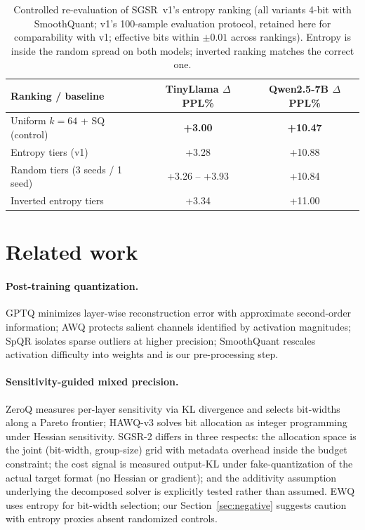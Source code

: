\documentclass{article}
\begin{document}
\begin{table}[t]
\centering
\caption{Controlled re-evaluation of SGSR~v1's entropy ranking (all
variants 4-bit with SmoothQuant; v1's 100-sample evaluation protocol,
retained here for comparability with v1; effective bits within
$\pm 0.01$ across rankings). Entropy is inside the random spread on both
models; inverted ranking matches the correct one.}
\label{tab:negative}
\begin{tabular}{lcc}
\toprule
\textbf{Ranking / baseline} & \textbf{TinyLlama} $\Delta$PPL\% & \textbf{Qwen2.5-7B} $\Delta$PPL\% \\
\midrule
Uniform $k{=}64$ + SQ (control) & \textbf{+3.00} & \textbf{+10.47} \\
Entropy tiers (v1)              & +3.28 & +10.88 \\
Random tiers (3 seeds / 1 seed) & +3.26 -- +3.93 & +10.84 \\
Inverted entropy tiers          & +3.34 & +11.00 \\
\bottomrule
\end{tabular}
\end{table}

\section{Related work}

\paragraph{Post-training quantization.}
GPTQ \citep{gptq} minimizes layer-wise reconstruction error with
approximate second-order information; AWQ \citep{awq} protects salient
channels identified by activation magnitudes; SpQR \citep{spqr} isolates
sparse outliers at higher precision; SmoothQuant \citep{smoothquant}
rescales activation difficulty into weights and is our pre-processing step.

\paragraph{Sensitivity-guided mixed precision.}
ZeroQ \citep{zeroq} measures per-layer sensitivity via KL divergence and
selects bit-widths along a Pareto frontier; HAWQ-v3 \citep{hawqv3} solves
bit allocation as integer programming under Hessian sensitivity. SGSR-2
differs in three respects: the allocation space is the joint
(bit-width, group-size) grid with metadata overhead inside the budget
constraint; the cost signal is measured output-KL under fake-quantization
of the actual target format (no Hessian or gradient); and the additivity
assumption underlying the decomposed solver is explicitly tested rather
than assumed. EWQ \citep{ewq} uses entropy for bit-width selection; our
Section~\ref{sec:negative} suggests caution with entropy proxies absent
randomized controls.
\end{document}
